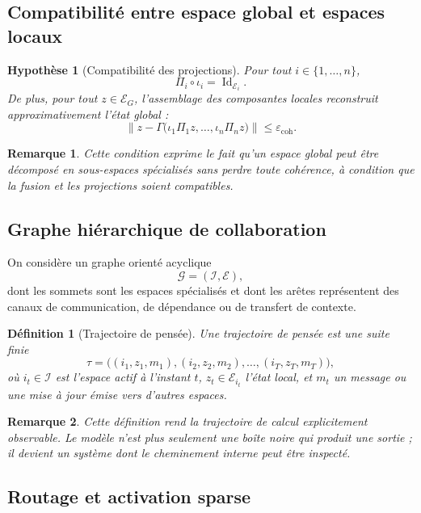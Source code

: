 \documentclass[11pt,a4paper]{article}
\newtheorem{definition}{Définition}[section]
\newtheorem{assumption}{Hypothèse}[section]
\newtheorem{remark}{Remarque}[section]
\DeclareMathOperator{\Id}{Id}
\newcommand{\E}{\mathcal E}
\newcommand{\I}{\mathcal I}
\newcommand{\Gcal}{\mathcal G}
\newcommand{\1}{\mathbf 1}
\begin{document}
\subsection{Compatibilité entre espace global et espaces locaux}

\begin{assumption}[Compatibilité des projections]
Pour tout \(i\in\{1,\dots,n\}\),
\[
\Pi_i\circ \iota_i = \Id_{\E_i}.
\]
De plus, pour tout \(z\in\E_G\), l'assemblage des composantes locales reconstruit approximativement l'état global :
\[
\left\| z - \Gamma\bigl(\iota_1\Pi_1 z,\dots,\iota_n\Pi_n z\bigr)\right\|
\le \varepsilon_{\mathrm{coh}}.
\]
\end{assumption}

\begin{remark}
Cette condition exprime le fait qu'un espace global peut être décomposé en sous-espaces spécialisés sans perdre toute cohérence, à condition que la fusion et les projections soient compatibles.
\end{remark}

\subsection{Graphe hiérarchique de collaboration}

On considère un graphe orienté acyclique
\[
\Gcal=(\I,\mathcal E),
\]
dont les sommets sont les espaces spécialisés et dont les arêtes représentent des canaux de communication, de dépendance ou de transfert de contexte.

\begin{definition}[Trajectoire de pensée]
Une trajectoire de pensée est une suite finie
\[
\tau
=
\bigl((i_1,z_1,m_1),(i_2,z_2,m_2),\dots,(i_T,z_T,m_T)\bigr),
\]
où \(i_t\in\I\) est l'espace actif à l'instant \(t\), \(z_t\in\E_{i_t}\) l'état local, et \(m_t\) un message ou une mise à jour émise vers d'autres espaces.
\end{definition}

\begin{remark}
Cette définition rend la trajectoire de calcul explicitement observable. Le modèle n'est plus seulement une boîte noire qui produit une sortie ; il devient un système dont le cheminement interne peut être inspecté.
\end{remark}

\subsection{Routage et activation sparse}
\end{document}
